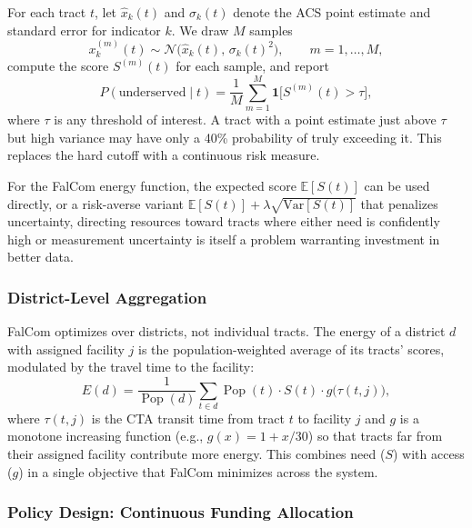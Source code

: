 \documentclass[11pt]{article}
\newcommand{\E}{\mathbb{E}}
\newcommand{\Var}{\mathrm{Var}}
\begin{document}
For each tract $t$, let $\hat{x}_k(t)$ and $\sigma_k(t)$ denote the ACS
point estimate and standard error for indicator $k$. We draw $M$ samples
\begin{equation}\label{eq:prob-imu}
  x_k^{(m)}(t) \sim \mathcal{N}\bigl(\hat{x}_k(t),\, \sigma_k(t)^2\bigr),
  \qquad m = 1, \ldots, M,
\end{equation}
compute the score $S^{(m)}(t)$ for each sample, and report
\begin{equation}\label{eq:prob-underserved}
  P(\text{underserved} \mid t) =
    \frac{1}{M} \sum_{m=1}^{M}
    \mathbf{1}\bigl[S^{(m)}(t) > \tau\bigr],
\end{equation}
where $\tau$ is any threshold of interest. A tract with a point estimate just
above $\tau$ but high variance may have only a 40\% probability of truly
exceeding it. This replaces the hard cutoff with a continuous risk measure.

For the FalCom energy function, the expected score $\E[S(t)]$ can be used
directly, or a risk-averse variant
$\E[S(t)] + \lambda \sqrt{\Var[S(t)]}$
that penalizes uncertainty, directing resources toward tracts where either
need is confidently high or measurement uncertainty is itself a problem
warranting investment in better data.


\subsubsection{District-Level Aggregation}\label{sec:district-score}

FalCom optimizes over districts, not individual tracts. The energy of a
district $d$ with assigned facility $j$ is the population-weighted average
of its tracts' scores, modulated by the travel time to the facility:
\begin{equation}\label{eq:district-energy}
  E(d) = \frac{1}{\operatorname{Pop}(d)}
    \sum_{t \in d} \operatorname{Pop}(t) \cdot S(t) \cdot
    g\bigl(\tau(t, j)\bigr),
\end{equation}
where $\tau(t, j)$ is the CTA transit time from tract $t$ to facility $j$
and $g$ is a monotone increasing function (e.g., $g(x) = 1 + x/30$) so that
tracts far from their assigned facility contribute more energy. This combines
need ($S$) with access ($g$) in a single objective that FalCom minimizes
across the system.


\subsubsection{Policy Design: Continuous Funding Allocation}\label{sec:transition}
\end{document}
